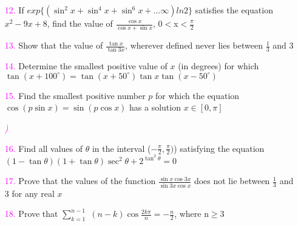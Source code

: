 \documentclass[journal,12pt,article,twocolumn]{IEEEtran}
\theoremstyle{remark}
\begin{document}
\begin{enumerate}
\begin{flushright}
    \textcolor{magenta}{\textit{}}
\end{flushright}
\item[\textcolor{magenta}{12.}] If $exp \{(\sin^2x+\sin^4x+\sin^6x+\dots\infty)ln2\}$ satisfies the equation $x^2-9x+8$, find the value of $\frac{\cos x}{\cos x + \sin x}$, 0$<$x$<$$\frac{\pi}{2}$
\begin{flushright}
    \textcolor{magenta}{\textit{}} 
\end{flushright}
\item[\textcolor{magenta}{13.}] Show that the value of  $\frac{\tan x}{\tan 3x}$, wherever defined never lies between $\frac{1}{3}$ and 3
\begin{flushright}
    \textcolor{magenta}{\textit{}}
\end{flushright}
\item[\textcolor{magenta}{14.}] Determine the smallest positive value of $x$ (in degrees) for which $\tan (x+100^\circ)=\tan (x+50^\circ)\tan x\tan (x-50^\circ)$
\begin{flushright}
   \textcolor{magenta}{\textit{}} 
\end{flushright}
\item[\textcolor{magenta}{15.}] Find the smallest positive number $p$ for which the equation $\cos (p\sin x)=\sin (p\cos x)$ has a solution \(x \in [0, \pi]\)
\begin{flushright}
    \textcolor{magenta}{\textit{}\textit{)}} 
\end{flushright}
\item[\textcolor{magenta}{16.}] Find all values of $\theta$ in the interval ($-\frac{\pi}{2},\frac{\pi}{2})$) satisfying the equation $(1-\tan \theta)(1+\tan \theta)\sec^2\theta+ 2^{\tan^2 \theta}=0$
\begin{flushright}
    \textcolor{magenta}{\textit{}}
\end{flushright}
\item[\textcolor{magenta}{17.}] Prove that the values of the function $\frac{\sin x \cos 3x}{\sin 3x \cos x}$ does not lie between $\frac{1}{3}$ and 3 for any real $x$
\begin{flushright}
    \textcolor{magenta}{\textit{}} 
\end{flushright}
\item[\textcolor{magenta}{18.}] Prove that $\sum_{k=1}^{n-1}$ $(n-k)\cos \frac{2k\pi}{n}=-\frac{n}{2}$, where n$\ge$3
$$
\end{enumerate}
\end{document}
